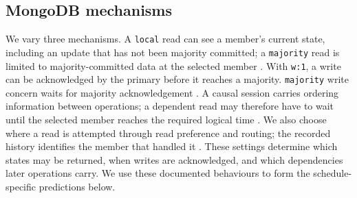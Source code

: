 \subsection{MongoDB mechanisms}

We vary three mechanisms. A \texttt{local} read can see a member's current
state, including an update that has not been majority committed; a
\texttt{majority} read is limited to majority-committed data at the selected member \cite{mongodb-read-concern}. With \texttt{w:1}, a write can be acknowledged by
the primary before it reaches a majority. \texttt{majority} write concern
waits for majority acknowledgement \cite{mongodb-write-concern}. A causal
session carries ordering information between operations; a dependent read may
therefore have to wait until the selected member reaches the required logical
time \cite{mongodb-causal-consistency}. We also choose where a read is attempted
through read preference and routing; the recorded history identifies the
member that handled it \cite{mongodb-read-preference}. These settings determine
which states may be returned, when writes are acknowledged, and which
dependencies later operations carry. We use these documented behaviours to
form the schedule-specific predictions below.


